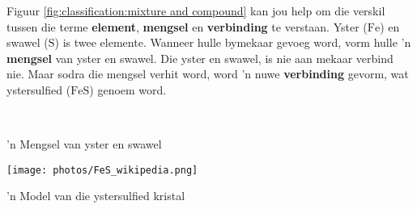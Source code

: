         \label{m38708*id63410} Figuur \ref{fig:classification:mixture and compound} kan jou help om die verskil tussen die terme \textbf{element}, \textbf{mengsel} en \textbf{verbinding} te verstaan. Yster ($\text{Fe}$) en swawel ($\text{S}$) is twee elemente. Wanneer hulle bymekaar gevoeg word, vorm hulle 'n \textbf{mengsel} van yster en swawel. Die yster en swawel, is nie aan mekaar verbind nie. Maar sodra die mengsel verhit word, word 'n nuwe \textbf{verbinding} gevorm, wat ystersulfied ($\text{FeS}$) genoem word.\par 
 \begin{minipage}{.5\textwidth}
    \begin{center}
\\
\begin{caption} 'n Mengsel van yster en swawel\end{caption}
\label{fig:classification:mixture and compound}
    \end{center}
\end{minipage}
 \begin{minipage}{.5\textwidth}
  \begin{center}
   \texttt{[image: photos/FeS\_wikipedia.png]}\\
\begin{caption} 'n Model van die ystersulfied kristal\end{caption}
  \end{center}

 \end{minipage}

